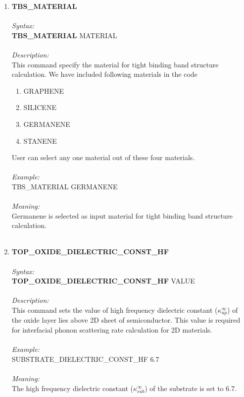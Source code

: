 \documentclass[12pt]{article}
\begin{document}
\begin{enumerate}
    \item \textbf{TBS\_MATERIAL}   \\ \\
    \textit{Syntax:} \\
    \textbf{TBS\_MATERIAL} MATERIAL \\ \\
    \textit{Description:} \\
    This command specify the material for tight binding band structure calculation. We have included following materials in the code
    \begin{enumerate}
        \item GRAPHENE
        \item SILICENE 
        \item GERMANENE
        \item STANENE 
    \end{enumerate}
    User can select any one material out of these four materials. \\ \\
    \textit{Example:} \\
    TBS\_MATERIAL GERMANENE \\ \\
    \textit{Meaning:} \\   
    Germanene is selected as input material for tight binding band structure calculation. \\ \\ 

    \item \textbf{TOP\_OXIDE\_DIELECTRIC\_CONST\_HF} \\  \\
    \textit{Syntax:} \\
    \textbf{TOP\_OXIDE\_DIELECTRIC\_CONST\_HF} VALUE \\ \\
    \textit{Description:} \\
    This command sets the value of high frequency dielectric constant ($\kappa_{up}^{\infty}$) of the oxide layer lies above 2D sheet of semiconductor. This value is required for interfacial phonon scattering rate calculation for 2D materials. \\ \\
    \textit{Example:} \\
    SUBSTRATE\_DIELECTRIC\_CONST\_HF 6.7 \\ \\
    \textit{Meaning:} \\    
    The high frequency dielectric constant ($\kappa_{sub}^{\infty}$) of the substrate is set to 6.7. \\ \\
   

\end{enumerate}
\end{document}
